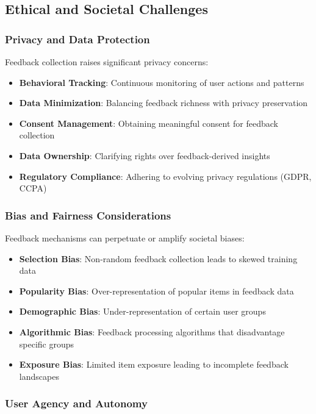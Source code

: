 \subsection{Ethical and Societal Challenges}

\subsubsection{Privacy and Data Protection}

Feedback collection raises significant privacy concerns:

\begin{itemize}
    \item \textbf{Behavioral Tracking}: Continuous monitoring of user actions and patterns
    \item \textbf{Data Minimization}: Balancing feedback richness with privacy preservation
    \item \textbf{Consent Management}: Obtaining meaningful consent for feedback collection
    \item \textbf{Data Ownership}: Clarifying rights over feedback-derived insights
    \item \textbf{Regulatory Compliance}: Adhering to evolving privacy regulations (GDPR, CCPA)
\end{itemize}

\subsubsection{Bias and Fairness Considerations}

Feedback mechanisms can perpetuate or amplify societal biases:

\begin{itemize}
    \item \textbf{Selection Bias}: Non-random feedback collection leads to skewed training data
    \item \textbf{Popularity Bias}: Over-representation of popular items in feedback data
    \item \textbf{Demographic Bias}: Under-representation of certain user groups
    \item \textbf{Algorithmic Bias}: Feedback processing algorithms that disadvantage specific groups
    \item \textbf{Exposure Bias}: Limited item exposure leading to incomplete feedback landscapes
\end{itemize}

\subsubsection{User Agency and Autonomy}

